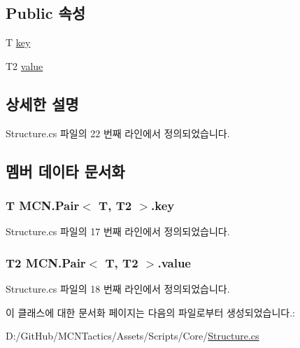 \subsection*{Public 속성}
\begin{DoxyCompactItemize}
\item 
T \hyperlink{class_m_c_n_1_1_pair_a62c546d3829b8819a65f8c9d64200338}{key}
\item 
T2 \hyperlink{class_m_c_n_1_1_pair_a1980bbf37b60fcbfea22382f71250e84}{value}
\end{DoxyCompactItemize}


\subsection{상세한 설명}


Structure.\+cs 파일의 22 번째 라인에서 정의되었습니다.



\subsection{멤버 데이타 문서화}
\subsubsection[{\texorpdfstring{key}{key}}]{\setlength{\rightskip}{0pt plus 5cm}T {\bf M\+C\+N.\+Pair}$<$ T, T2 $>$.key\hspace{0.3cm}{\ttfamily [inherited]}}\hypertarget{class_m_c_n_1_1_pair_a62c546d3829b8819a65f8c9d64200338}{}\label{class_m_c_n_1_1_pair_a62c546d3829b8819a65f8c9d64200338}


Structure.\+cs 파일의 17 번째 라인에서 정의되었습니다.

\subsubsection[{\texorpdfstring{value}{value}}]{\setlength{\rightskip}{0pt plus 5cm}T2 {\bf M\+C\+N.\+Pair}$<$ T, T2 $>$.value\hspace{0.3cm}{\ttfamily [inherited]}}\hypertarget{class_m_c_n_1_1_pair_a1980bbf37b60fcbfea22382f71250e84}{}\label{class_m_c_n_1_1_pair_a1980bbf37b60fcbfea22382f71250e84}


Structure.\+cs 파일의 18 번째 라인에서 정의되었습니다.



이 클래스에 대한 문서화 페이지는 다음의 파일로부터 생성되었습니다.\+:\begin{DoxyCompactItemize}
\item 
D\+:/\+Git\+Hub/\+M\+C\+N\+Tactics/\+Assets/\+Scripts/\+Core/\hyperlink{_structure_8cs}{Structure.\+cs}\end{DoxyCompactItemize}
